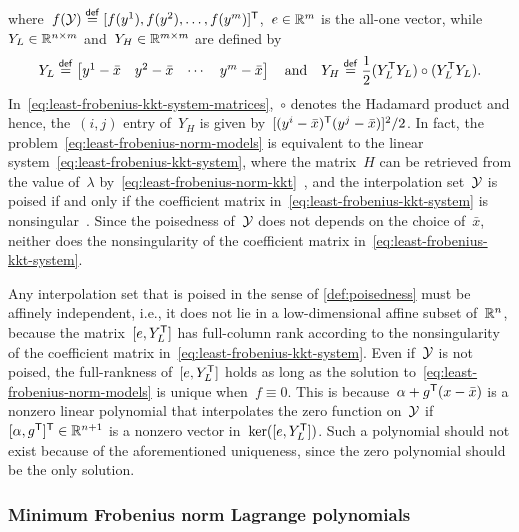 where~$\obj(\xpt) \eqdef [\obj(y^1), \obj(y^2), \dots, \obj(y^m)]^{\T}$,~$e \in \mathbb{R}^m$ is the all-one vector, while~$Y_L \in \mathbb{R}^{n \times m}$ and~$Y_H \in \mathbb{R}^{m \times m}$ are defined by
\begin{equation}
    \label{eq:least-frobenius-kkt-system-matrices}
    Y_L \mathrel{\stackrel{\mathsf{def}}{=}} 
    \begin{bmatrix}
        y^1 - \bar{x}   & y^2 - \bar{x} & \cdots    & y^m - \bar{x}
    \end{bmatrix} \quad \text{and} \quad Y_H \mathrel{\stackrel{\mathsf{def}}{=}} \frac{1}{2} (Y_L^{\mathsf{T}} Y_L) \circ (Y_L^{\mathsf{T}} Y_L).
\end{equation}
In~\cref{eq:least-frobenius-kkt-system-matrices},~$\circ$ denotes the Hadamard product and hence, the~$(i, j)$ entry of~$Y_H$ is given by~$[(y^i - \bar{x})^{\mathsf{T}} (y^j - \bar{x})]^2 / 2$.
In fact, the problem~\cref{eq:least-frobenius-norm-models} is equivalent to the linear system~\cref{eq:least-frobenius-kkt-system}, where the matrix~$H$ can be retrieved from the value of~$\lambda$ by~\cref{eq:least-frobenius-norm-kkt}~\cite[\S~2]{Powell_2004b}, and the interpolation set~$\xpt$ is poised if and only if the coefficient matrix in~\cref{eq:least-frobenius-kkt-system} is nonsingular~\cite[\S~5.3]{Conn_Scheinberg_Vicente_2009b}.
Since the poisedness of~$\xpt$ does not depends on the choice of~$\bar{x}$, neither does the nonsingularity of the coefficient matrix in~\cref{eq:least-frobenius-kkt-system}.

Any interpolation set that is poised in the sense of \cref{def:poisedness} must be affinely independent, i.e., it does not lie in a low-dimensional affine subset of~$\mathbb{R}^n$, because the matrix~$[e, Y_L^{\mathsf{T}}]$ has full-column rank according to the nonsingularity of the coefficient matrix in~\cref{eq:least-frobenius-kkt-system}.
Even if~$\xpt$ is not poised, the full-rankness of~$[e, Y_L^{\mathsf{T}}]$ holds as long as the solution to~\cref{eq:least-frobenius-norm-models} is unique when~$f \equiv 0$.
This is because~$\alpha + g^{\mathsf{T}} (x - \bar{x})$ is a nonzero linear polynomial that interpolates the zero function on~$\xpt$ if~$[\alpha, g^{\mathsf{T}}]^{\mathsf{T}} \in \mathbb{R}^{n + 1}$ is a nonzero vector in~$\ker([e, Y_L^{\mathsf{T}}])$.
Such a polynomial should not exist because of the aforementioned uniqueness, since the zero polynomial should be the only solution.

\subsubsection{Minimum Frobenius norm Lagrange polynomials}

